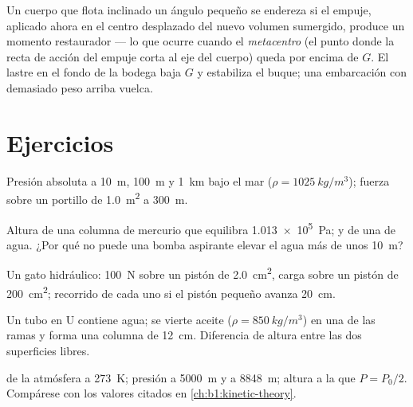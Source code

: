 \begin{remark}[Estabilidad]\label{rem:b1:fluid-statics:stability}
Un cuerpo que flota inclinado un ángulo pequeño se endereza si el empuje,
aplicado ahora en el centro desplazado del nuevo volumen sumergido, produce
un momento restaurador --- lo que ocurre cuando el \emph{metacentro} (el
punto donde la recta de acción del empuje corta al eje del cuerpo) queda
por encima de $G$. El lastre en el fondo de la bodega baja $G$ y estabiliza
el buque; una embarcación con demasiado peso arriba vuelca.
\end{remark}

\section{Ejercicios}

\begin{exercise}[$\star$]\label{exo:b1:fluid-statics:1}
Presión absoluta a \qty{10}{m}, \qty{100}{m} y \qty{1}{km} bajo el mar
($\rho = \qty{1025}{kg/m^3}$); fuerza sobre un portillo de \qty{1.0}{m^2} a
\qty{300}{m}.
\end{exercise}

\begin{exercise}[$\star$]\label{exo:b1:fluid-statics:2}
Altura de una columna de mercurio que equilibra \qty{1.013e5}{Pa}; y de una
de agua. ¿Por qué no puede una bomba aspirante elevar el agua más de unos
\qty{10}{m}?
\end{exercise}

\begin{exercise}[$\star$]\label{exo:b1:fluid-statics:3}
Un gato hidráulico: \qty{100}{N} sobre un pistón de \qty{2.0}{cm^2}, carga
sobre un pistón de \qty{200}{cm^2}; recorrido de cada uno si el pistón
pequeño avanza \qty{20}{cm}.
\end{exercise}

\begin{exercise}[$\star$]\label{exo:b1:fluid-statics:4}
Un tubo en U contiene agua; se vierte aceite ($\rho = \qty{850}{kg/m^3}$) en
una de las ramas y forma una columna de \qty{12}{cm}. Diferencia de altura
entre las dos superficies libres.
\end{exercise}

\begin{exercise}[$\star\star$]\label{exo:b1:fluid-statics:5}
 de la atmósfera a \qty{273}{K}; presión a \qty{5000}{m} y a
\qty{8848}{m}; altura a la que $P = P_0/2$. Compárese con los valores
citados en \cref{ch:b1:kinetic-theory}.
\end{exercise}

